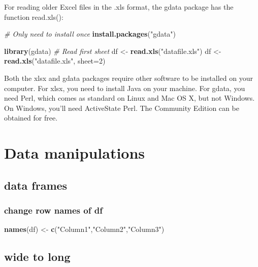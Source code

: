 \documentclass[
]{book}
\newenvironment{Shaded}{\begin{snugshade}}{\end{snugshade}}
\newcommand{\CommentTok}[1]{\textcolor[rgb]{0.56,0.35,0.01}{\textit{#1}}}
\newcommand{\DataTypeTok}[1]{\textcolor[rgb]{0.13,0.29,0.53}{#1}}
\newcommand{\DecValTok}[1]{\textcolor[rgb]{0.00,0.00,0.81}{#1}}
\newcommand{\KeywordTok}[1]{\textcolor[rgb]{0.13,0.29,0.53}{\textbf{#1}}}
\newcommand{\NormalTok}[1]{#1}
\newcommand{\StringTok}[1]{\textcolor[rgb]{0.31,0.60,0.02}{#1}}
\begin{document}
For reading older Excel files in the .xls format, the gdata package has the function read.xls():

\begin{Shaded}
\begin{Highlighting}[]
\CommentTok{# Only need to install once}
\KeywordTok{install.packages}\NormalTok{(}\StringTok{"gdata"}\NormalTok{)}

\KeywordTok{library}\NormalTok{(gdata)}
\CommentTok{# Read first sheet}
\NormalTok{df <-}\StringTok{ }\KeywordTok{read.xls}\NormalTok{(}\StringTok{"datafile.xls"}\NormalTok{)}
\NormalTok{df <-}\StringTok{ }\KeywordTok{read.xls}\NormalTok{(}\StringTok{"datafile.xls"}\NormalTok{, }\DataTypeTok{sheet=}\DecValTok{2}\NormalTok{)}
\end{Highlighting}
\end{Shaded}

Both the xlsx and gdata packages require other software to be installed on your computer. For xlsx, you need to install Java on your machine. For gdata, you need Perl, which comes as standard on Linux and Mac OS X, but not Windows. On Windows, you'll need ActiveState Perl. The Community Edition can be obtained for free.

\hypertarget{data-manipulations}{%
\section{Data manipulations}\label{data-manipulations}}

\hypertarget{data-frames}{%
\subsection{data frames}\label{data-frames}}

\hypertarget{change-row-names-of-df}{%
\subsubsection{change row names of df}\label{change-row-names-of-df}}

\begin{Shaded}
\begin{Highlighting}[]
\KeywordTok{names}\NormalTok{(df) <-}\StringTok{ }\KeywordTok{c}\NormalTok{(}\StringTok{"Column1"}\NormalTok{,}\StringTok{"Column2"}\NormalTok{,}\StringTok{"Column3"}\NormalTok{)}
\end{Highlighting}
\end{Shaded}

\hypertarget{wide-to-long}{%
\subsection{wide to long}\label{wide-to-long}}
\end{document}
